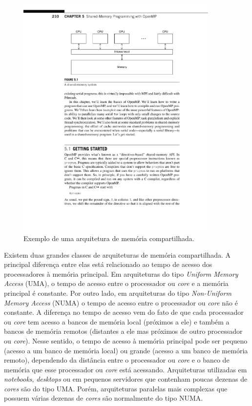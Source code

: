 \documentclass{SBCbookchapter}
\begin{document}
	\begin{figure}[h]
		\centering
		\includegraphics[width=10cm, height=!]{figs/arquitetura-multicore.pdf}
		\caption{Exemplo de uma arquitetura de memória compartilhada.}
		\label{fig:arquitetura-multicore}
	\end{figure}

	Existem duas grandes classes de arquiteturas de memória compartilhada. A
	principal diferença entre elas está relacionado ao tempo de acesso dos
	processadores à memória principal. Em arquiteturas do tipo
	\textit{Uniform Memory Access} (UMA), o tempo de acesso entre o
	processador ou \textit{core} e a memória principal é constante. Por
	outro lado, em arquiteturas do tipo \textit{Non-Uniform Memory Access}
	(NUMA) o tempo de acesso entre o processador ou \textit{core} não é
	constante. A diferença no tempo de acesso vem do fato de que cada
	processador ou \textit{core} tem acesso a bancos de memória local
	(próximos a ele) e também a bancos de memória remotos (distantes a ele
	mas próximos de outro processador ou \textit{core}). Nesse sentido, o
	tempo de acesso à memória principal pode ser pequeno (acesso a um banco
	de memória local) ou grande (acesso a um banco de memória remoto),
	dependendo da distância entre o processador ou \textit{core} e o banco
	de memória que esse processador ou \textit{core} está acessando.
	Arquiteturas utilizadas em \textit{notebooks}, \textit{desktops} ou em
	pequenos servidores que contenham poucas dezenas de \textit{cores} são
	do tipo UMA. Porém, arquiteturas paralelas mais complexas que possuem
	várias dezenas de \textit{cores} são normalmente do tipo NUMA.
\end{document}
